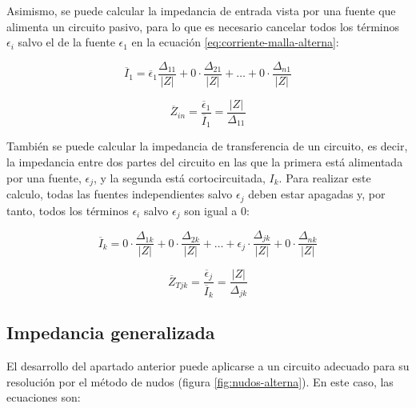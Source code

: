 Asimismo, se puede calcular la impedancia de entrada vista por una
fuente que alimenta un circuito pasivo, para lo que es necesario
cancelar todos los términos $\epsilon_i$ salvo el de la fuente
$\epsilon_1$ en la ecuación \ref{eq:corriente-malla-alterna}:

\begin{equation}
  \overline{I}_1 = \overline{\epsilon}_1 \frac{\Delta_{11}}{|Z|} + 0 \cdot \frac{\Delta_{21}}{|Z|} + \dots + 0 \cdot \frac{\Delta_{n1}}{|Z|}
\end{equation}

\begin{equation}
  \label{eq:impedancia-entrada}
  \overline{Z}_{in} = \frac{\overline{\epsilon}_1}{\overline{I}_1}=  \frac{|Z|}{\Delta_{11}}
\end{equation}

También se puede calcular la impedancia de transferencia de un
circuito, es decir, la impedancia entre dos partes del circuito en las
que la primera está alimentada por una fuente, $\epsilon_j$, y la
segunda está cortocircuitada, $I_k$. Para realizar este calculo, todas
las fuentes independientes salvo $\epsilon_j$ deben estar apagadas y,
por tanto, todos los términos $\epsilon_i$ salvo $\epsilon_j$ son
igual a 0:

\begin{equation}
  \overline{I}_k = 0 \cdot \frac{\Delta_{1k}}{|Z|} + 0 \cdot \frac{\Delta_{2k}}{|Z|} + \dots + \epsilon_j \cdot \frac{\Delta_{jk}}{|Z|} + 0 \cdot \frac{\Delta_{nk}}{|Z|}
\end{equation}

\begin{equation}
  \label{eq:impedancia-transferencia}
  \overline{Z}_{Tjk} = \frac{\overline{\epsilon}_j}{\overline{I}_k}=  \frac{|Z|}{\Delta_{jk}}
\end{equation}


\subsection{Impedancia generalizada}
\label{sec:impedancia-generalizada}

El desarrollo del apartado anterior puede aplicarse a un circuito
adecuado para su resolución por el método de nudos (figura
\ref{fig:nudos-alterna}). En este caso, las ecuaciones son:

